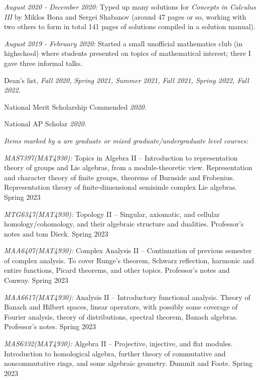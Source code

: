 \documentclass[11pt]{article}
\begin{document}
\textsl{August 2020 - December 2020:} Typed up many solutions for \textsl{Concepts in Calculus
III} by Miklos Bona and Sergei Shabanov (around 47 pages or so, working with two others to form in total 141 pages of solutions compiled in a solution manual).

\textsl{August 2019 - February 2020:} Started a small unofficial mathematics club (in highschool) where students presented on topics of mathematical interest; there I gave three informal talks.


Dean's list, \textsl{Fall 2020, Spring 2021, Summer 2021, Fall 2021, Spring 2022, Fall 2022}.

National Merit Scholarship Commended \textsl{2020}.

National AP Scholar \textsl{2020}.


\textsl{Items marked by a \textsuperscript{\textdagger} are graduate or mixed graduate/undergraduate level courses:}

\textsl{MAS7397(MAT4930)\textsuperscript{\textdagger}:} Topics in Algebra II -- Introduction to representation theory of groups and Lie algebras, from a module-theoretic view. Representation and character theory of finite groups, theorems of Burnside and Frobenius. Representation theory of finite-dimensional semisimle complex Lie algebras. Spring 2023

\textsl{MTG6347(MAT4930)\textsuperscript{\textdagger}:} Topology II -- Singular, axiomatic, and cellular homology/cohomology, and their algebraic structure and dualities. Professor's notes and tom Dieck. Spring 2023

\textsl{MAA6407(MAT4930)\textsuperscript{\textdagger}:} Complex Analysis II -- Continuation of previous semester of complex analysis. To cover Runge's theorem, Schwarz reflection, harmonic and entire functions, Picard theorems, and other topics. Professor's notes and Conway. Spring 2023

\textsl{MAA6617(MAT4930)\textsuperscript{\textdagger}:} Analysis II -- Introductory functional analysis. Theory of Banach and Hilbert spaces, linear operators, with possibly some coverage of Fourier analysis, theory of distributions, spectral theorem, Banach algebras. Professor's notes. Spring 2023

\textsl{MAS6332(MAT4930)\textsuperscript{\textdagger}:} Algebra II -- Projective, injective, and flat modules. Introduction to homological algebra, further theory of commutative and noncommutative rings, and some algebraic geometry. Dummit and Foote. Spring 2023
\end{document}
